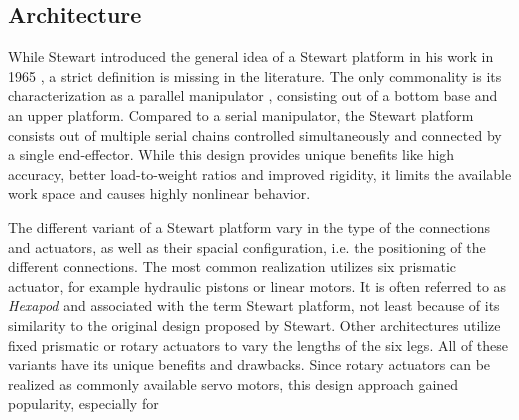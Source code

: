 \subsection{Architecture}
While Stewart introduced the general idea of a Stewart platform in his work in
1965 \citep{Ste65}, a strict definition is missing in the literature. The only
commonality is its characterization as a parallel manipulator \citep{Szu13},
consisting out of a bottom base and an upper platform. Compared to a serial
manipulator, the Stewart platform consists out of multiple serial chains
controlled simultaneously and connected by a single end-effector. While this
design provides unique benefits like high accuracy, better load-to-weight
ratios and improved rigidity, it limits the available work space and causes
highly nonlinear behavior.

The different variant of a Stewart platform vary in the type of the
connections and actuators, as well as their spacial configuration, i.e. the
positioning of the different connections. The most common realization utilizes
six prismatic actuator, for example hydraulic pistons or linear motors. It is
often referred to as \emph{Hexapod} and associated with the term Stewart
platform, not least because of its similarity to the original design proposed
by Stewart. Other architectures utilize fixed prismatic or rotary actuators to
vary the lengths of the six legs. All of these variants have its unique
benefits and drawbacks. Since rotary actuators can be realized as commonly
available servo motors, this design approach gained popularity, especially for
